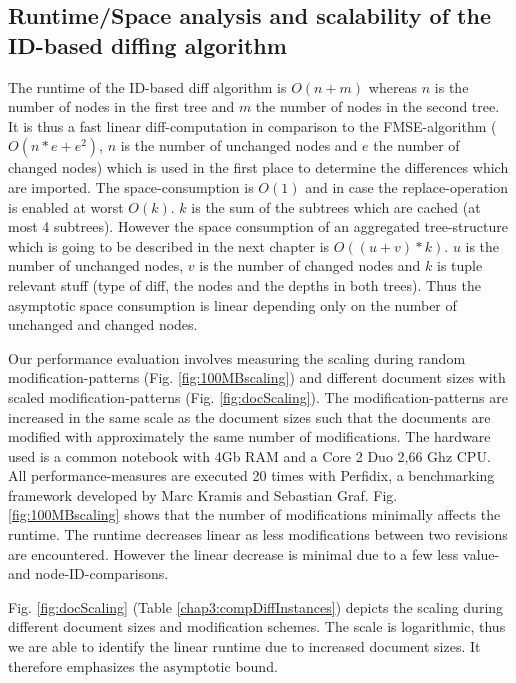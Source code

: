 \subsection{Runtime/Space analysis and scalability of the ID-based diffing algorithm}
The runtime of the ID-based diff algorithm is $O(n+m)$ whereas $n$ is the number of nodes in the first tree and $m$ the number of nodes in the second tree. It is thus a fast linear diff-computation in comparison to the FMSE-algorithm ($O(n*e+e^2)$, $n$ is the number of unchanged nodes and $e$ the number of changed nodes) which is used in the first place to determine the differences which are imported. The space-consumption is $O(1)$ and in case the replace-operation is enabled at worst $O(k)$. $k$ is the sum of the subtrees which are cached (at most 4 subtrees). However the space consumption of an aggregated tree-structure which is going to be described in the next chapter is $O((u+v)*k)$. $u$ is the number of unchanged nodes, $v$ is the number of changed nodes and $k$ is tuple relevant stuff (type of diff, the nodes and the depths in both trees). Thus the asymptotic space consumption is linear depending only on the number of unchanged and changed nodes.

Our performance evaluation involves measuring the scaling during random modification-patterns (Fig. \ref{fig:100MBscaling}) and different document sizes with scaled modi\-fication-patterns (Fig. \ref{fig:docScaling}). The modification-patterns are increased in the same scale as the document sizes such that the documents are modified with approximately the same number of modifications. The hardware used is a common notebook with 4Gb RAM and a Core 2 Duo 2,66 Ghz CPU. All performance-measures are executed 20 times with Perfidix\cite{kramis2007perfidix}, a benchmarking framework developed by Marc Kramis and Sebastian Graf. Fig. \ref{fig:100MBscaling} shows that the number of modifications minimally affects the runtime. The runtime decreases linear as less modifications between two revisions are encountered. However the linear decrease is minimal due to a few less value- and node-ID-comparisons.

Fig. \ref{fig:docScaling} (Table \ref{chap3:compDiffInstances}) depicts the scaling during different document sizes and modification schemes. The scale is logarithmic, thus we are able to identify the linear runtime due to increased document sizes. It therefore emphasizes the asymptotic bound.

